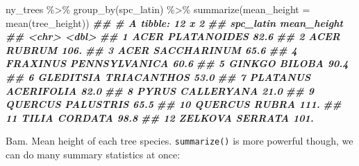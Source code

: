 \documentclass[
]{krantz}
\newenvironment{Shaded}{\begin{snugshade}}{\end{snugshade}}
\newcommand{\AttributeTok}[1]{\textcolor[rgb]{0.77,0.63,0.00}{#1}}
\newcommand{\DocumentationTok}[1]{\textcolor[rgb]{0.56,0.35,0.01}{\textbf{\textit{#1}}}}
\newcommand{\FunctionTok}[1]{\textcolor[rgb]{0.00,0.00,0.00}{#1}}
\newcommand{\NormalTok}[1]{#1}
\newcommand{\SpecialCharTok}[1]{\textcolor[rgb]{0.00,0.00,0.00}{#1}}
\begin{document}
\begin{Shaded}
\begin{Highlighting}[]
\NormalTok{ny\_trees }\SpecialCharTok{\%\textgreater{}\%}
  \FunctionTok{group\_by}\NormalTok{(spc\_latin) }\SpecialCharTok{\%\textgreater{}\%}
  \FunctionTok{summarize}\NormalTok{(}\AttributeTok{mean\_height =} \FunctionTok{mean}\NormalTok{(tree\_height))}
\DocumentationTok{\#\# \# A tibble: 12 x 2}
\DocumentationTok{\#\#    spc\_latin              mean\_height}
\DocumentationTok{\#\#    \textless{}chr\textgreater{}                        \textless{}dbl\textgreater{}}
\DocumentationTok{\#\#  1 ACER PLATANOIDES              82.6}
\DocumentationTok{\#\#  2 ACER RUBRUM                  106. }
\DocumentationTok{\#\#  3 ACER SACCHARINUM              65.6}
\DocumentationTok{\#\#  4 FRAXINUS PENNSYLVANICA        60.6}
\DocumentationTok{\#\#  5 GINKGO BILOBA                 90.4}
\DocumentationTok{\#\#  6 GLEDITSIA TRIACANTHOS         53.0}
\DocumentationTok{\#\#  7 PLATANUS ACERIFOLIA           82.0}
\DocumentationTok{\#\#  8 PYRUS CALLERYANA              21.0}
\DocumentationTok{\#\#  9 QUERCUS PALUSTRIS             65.5}
\DocumentationTok{\#\# 10 QUERCUS RUBRA                111. }
\DocumentationTok{\#\# 11 TILIA CORDATA                 98.8}
\DocumentationTok{\#\# 12 ZELKOVA SERRATA              101.}
\end{Highlighting}
\end{Shaded}

Bam. Mean height of each tree species. \texttt{summarize()} is more powerful though, we can do many summary statistics at once:
\end{document}
